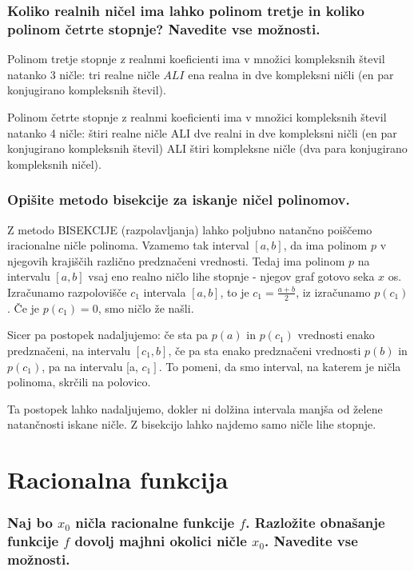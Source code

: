 \documentclass{article}
\begin{document}
\subsubsection*{Koliko realnih ničel ima lahko polinom tretje in koliko polinom četrte stopnje? Navedite vse možnosti.}

Polinom tretje stopnje z realnmi koeficienti ima v množici kompleksnih števil natanko 3 ničle: tri realne ničle $A L I$ ena realna in dve kompleksni ničli (en par konjugirano kompleksnih števil).

Polinom četrte stopnje z realnmi koeficienti ima v množici kompleksnih števil natanko 4 ničle: štiri realne ničle ALI dve realni in dve kompleksni ničli (en par konjugirano kompleksnih števil) ALI štiri kompleksne ničle (dva para konjugirano kompleksnih ničel).

\subsubsection*{Opišite metodo bisekcije za iskanje ničel polinomov.}

Z metodo BISEKCIJE (razpolavljanja) lahko poljubno natančno poiščemo iracionalne ničle polinoma. Vzamemo tak interval $[a, b]$, da ima polinom $p$ v njegovih krajiščih različno predznačeni vrednosti. Tedaj ima polinom $p$ na intervalu $[a, b]$ vsaj eno realno ničlo lihe stopnje - njegov graf gotovo seka $x$ os. Izračunamo razpolovišče $c_{1}$ intervala $[a, b]$, to je $c_{1}=\frac{a+b}{2}$, iz izračunamo $p\left(c_{1}\right)$. Če je $p\left(c_{1}\right)=0$, smo ničlo že našli.

Sicer pa postopek nadaljujemo: če sta pa $p(a)$ in $p(c_1)$ vrednosti enako predznačeni, na intervalu $\left[c_{1}, b\right]$, če pa sta enako predznačeni vrednosti $p(b)$ in $p\left(c_{1}\right)$, pa na intervalu [a, $\left.c_{1}\right]$. To pomeni, da smo interval, na katerem je ničla polinoma, skrčili na polovico.

Ta postopek lahko nadaljujemo, dokler ni dolžina intervala manjša od želene natančnosti iskane ničle. Z bisekcijo lahko najdemo samo ničle lihe stopnje.

\section{Racionalna funkcija}
\subsubsection*{Naj bo $x_{0}$ ničla racionalne funkcije $f$. Razložite obnašanje funkcije $f$ dovolj majhni okolici ničle $x_{0}$. Navedite vse možnosti.}
\end{document}
